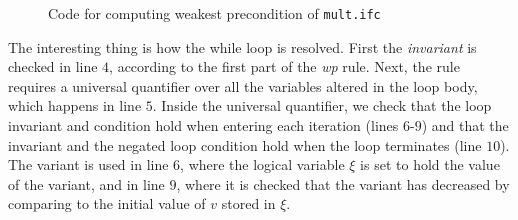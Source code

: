 \begin{figure}[h!]

\caption{Code for computing weakest precondition of \texttt{mult.ifc}}
\label{figure:wpmult}
\end{figure}

The interesting thing is how the while loop is resolved. First the \textit{invariant} is checked in line $4$, according to the first part of the \textit{wp} rule.
Next, the rule requires a universal quantifier over all the variables altered in the loop body, which happens in line $5$.
Inside the universal quantifier, we check that the loop invariant and condition hold when entering each iteration (lines $6$-$9$) and that the invariant and the negated loop condition hold when the loop terminates (line $10$).
The variant is used in line $6$, where the logical variable $\xi$ is set to hold the value of the variant, and in line $9$, where it is checked that the variant has decreased by comparing to the initial value of $v$ stored in $\xi$.
